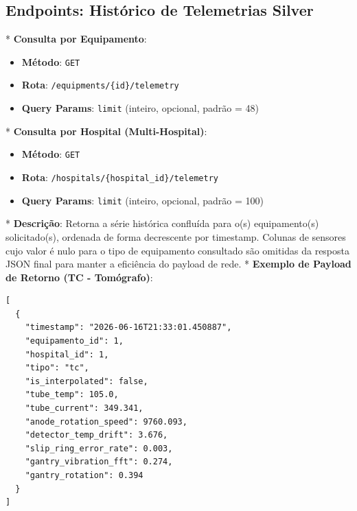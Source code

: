 \documentclass[12pt,a4paper]{article}
\begin{document}
\subsection{Endpoints: Histórico de Telemetrias Silver}
*   \textbf{Consulta por Equipamento}:
    \begin{itemize}
        \item \textbf{Método}: \texttt{GET}
        \item \textbf{Rota}: \texttt{/equipments/\{id\}/telemetry}
        \item \textbf{Query Params}: \texttt{limit} (inteiro, opcional, padrão = 48)
    \end{itemize}
*   \textbf{Consulta por Hospital (Multi-Hospital)}:
    \begin{itemize}
        \item \textbf{Método}: \texttt{GET}
        \item \textbf{Rota}: \texttt{/hospitals/\{hospital\_id\}/telemetry}
        \item \textbf{Query Params}: \texttt{limit} (inteiro, opcional, padrão = 100)
    \end{itemize}
*   \textbf{Descrição}: Retorna a série histórica confluída para o(s) equipamento(s) solicitado(s), ordenada de forma decrescente por timestamp. Colunas de sensores cujo valor é nulo para o tipo de equipamento consultado são omitidas da resposta JSON final para manter a eficiência do payload de rede.
*   \textbf{Exemplo de Payload de Retorno (TC - Tomógrafo)}:
\begin{lstlisting}
[
  {
    "timestamp": "2026-06-16T21:33:01.450887",
    "equipamento_id": 1,
    "hospital_id": 1,
    "tipo": "tc",
    "is_interpolated": false,
    "tube_temp": 105.0,
    "tube_current": 349.341,
    "anode_rotation_speed": 9760.093,
    "detector_temp_drift": 3.676,
    "slip_ring_error_rate": 0.003,
    "gantry_vibration_fft": 0.274,
    "gantry_rotation": 0.394
  }
]
\end{lstlisting}
\end{document}
